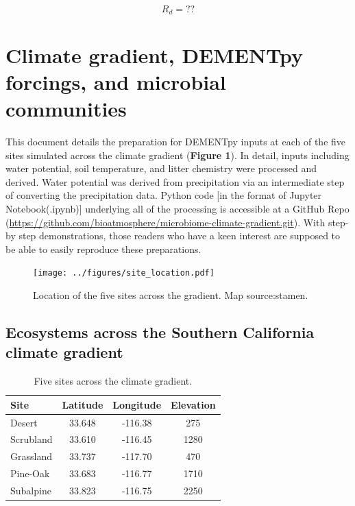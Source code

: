 \documentclass[letterpaper, 10pt]{article}
\begin{document}
\begin{equation}
  R_{d} = ?? 
\end{equation}

\section{Climate gradient, DEMENTpy forcings, and microbial communities}
This document details the preparation for DEMENTpy inputs at each of 
 the five sites simulated across the climate gradient (\textbf{Figure 1}).
 In detail, inputs including water potential, soil temperature, and litter 
 chemistry were processed and derived. Water potential was derived from 
 precipitation via an intermediate step of converting the precipitation 
 data. Python code [in the format of Jupyter Notebook(.ipynb)] underlying
 all of the processing is accessible at a GitHub Repo (\url{https://github.com/bioatmosphere/microbiome-climate-gradient.git}).
 With step-by step demonstrations, those readers who have a
 keen interest are supposed to be able to easily reproduce these preparations.

\begin{figure}[h]
\centering
      \texttt{[image: ../figures/site\_location.pdf]}
      \caption{Location of the five sites across the gradient. Map source:stamen.}
      \label{fig: figure 1}
\end{figure}

\subsection{\large Ecosystems across the Southern California climate gradient}

\begin{table}[h!]
  \begin{center}
    \caption{Five sites across the climate gradient.}
    \label{tab: table1}
    \begin{tabular}{lccc}
      \toprule %
      \textbf{Site} & \textbf{Latitude} & \textbf{Longitude} & \textbf{Elevation}\\
      \midrule %
      Desert       & 33.648 & -116.38 & 275\\
      Scrubland & 33.610 & -116.45 & 1280\\
      Grassland & 33.737 & -117.70 & 470\\
      Pine-Oak  & 33.683 & -116.77  & 1710\\
      Subalpine & 33.823 & -116.75  & 2250\\
      \bottomrule %
    \end{tabular}
  \end{center}
\end{table}
\end{document}
